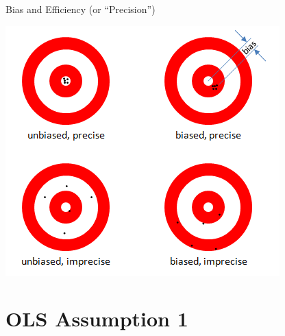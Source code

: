 \documentclass[
  8pt,
  ignorenonframetext,
  dvipsnames]{beamer}
\begin{document}
\begin{frame}{Bias and Efficiency (or ``Precision'')}
\protect\hypertarget{bias-and-efficiency-or-precision}{}

\includegraphics{bias_efficiency.png}

\end{frame}

\hypertarget{ols-assumption-1}{%
\section{OLS Assumption 1}\label{ols-assumption-1}}
\end{document}
